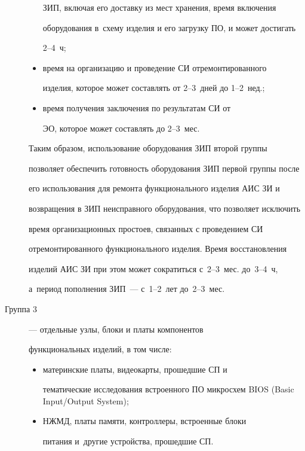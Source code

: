 \begin{description}
\begin{itemize}
ЗИП, включая его доставку из мест хранения, время включения

оборудования в~схему изделия и его загрузку ПО, и может достигать

     2--4~ч;

     \item  время на организацию и проведение СИ отремонтированного

изделия, которое может составлять от 2--3~дней до 1--2~нед.;

     \item  время получения заключения по результатам СИ от

ЭО, которое может составлять до 2--3~мес.

     \end{itemize}



     Таким образом, использование оборудования ЗИП второй группы

позволяет обеспечить готовность оборудования ЗИП первой группы после

его использования для ремонта функционального изделия АИС ЗИ и

возвращения в ЗИП неисправного оборудования, что позволяет исключить

время организационных простоев, связанных с проведением СИ

отремонтированного функционального изделия. Время восстановления

изделий АИС ЗИ при этом может сократиться с~2--3~мес. до~3--4~ч,

а~период пополнения ЗИП~--- с~1--2~лет до~2--3~мес.



\item[Группа 3] --- отдельные узлы, блоки и платы компонентов

функциональных изделий, в том числе:

     \begin{itemize}

     \item материнские платы, видеокарты, прошедшие СП и

тематические исследования встроенного ПО микросхем BIOS (Basic Input/Output System);

     \item НЖМД, платы памяти, контроллеры, встроенные блоки

питания и~другие устройства, прошедшие СП.

     \end{itemize}




\end{description}

